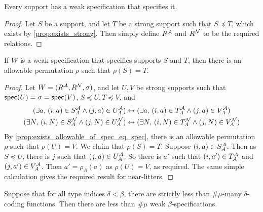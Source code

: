 \begin{proposition}
  \label{prop:exists_weakSpec}
  Every support has a weak specification that specifies it.
\end{proposition}
\begin{proof}
  Let \( S \) be a support, and let \( T \) be a strong support such that \( S \preceq T \), which exists by \cref{prop:exists_strong}.
  Then simply define \( R^{\mathcal A} \) and \( R^{\mathcal N} \) to be the required relations.
\end{proof}
\begin{proposition}
  \label{prop:exists_allowable_of_weakSpec}
  If \( W \) is a weak specification that specifies supports \( S \) and \( T \), then there is an allowable permutation \( \rho \) such that \( \rho(S) = T \).
\end{proposition}
\begin{proof}
  Let \( W = (R^{\mathcal A}, R^{\mathcal N}, \sigma) \), and let \( U, V \) be strong supports such that \( \operatorname{\mathsf{spec}}(U) = \sigma = \operatorname{\mathsf{spec}}(V) \), \( S \preceq U, T \preceq V \), and
  \begin{align*}
    (\exists a,\, (i, a) \in S_A^{\mathcal A} \wedge (j, a) \in U_A^{\mathcal A}) &\leftrightarrow (\exists a,\, (i, a) \in T_A^{\mathcal A} \wedge (j, a) \in V_A^{\mathcal A}) \\
    (\exists N,\, (i, N) \in S_A^{\mathcal N} \wedge (j, N) \in U_A^{\mathcal N}) &\leftrightarrow (\exists N,\, (i, N) \in T_A^{\mathcal N} \wedge (j, N) \in V_A^{\mathcal N})
  \end{align*}
  By \cref{prop:exists_allowable_of_spec_eq_spec}, there is an allowable permutation \( \rho \) such that \( \rho(U) = V \).
  We claim that \( \rho(S) = T \).
  Suppose \( (i, a) \in S_A^{\mathcal A} \).
  Then as \( S \preceq U \), there is \( j \) such that \( (j, a) \in U_A^{\mathcal A} \).
  So there is \( a' \) such that \( (i, a') \in T_A^{\mathcal A} \) and \( (j, a') \in V_A^{\mathcal A} \).
  Then \( a' = \rho_A(a) \) as \( \rho(U) = V \), as required.
  The same simple calculation gives the required result for near-litters.
\end{proof}
\begin{proposition}
  \label{prop:card_weakSpec}
  Suppose that for all type indices \( \delta < \beta \), there are strictly less than \( \#\mu \)-many \( \delta \)-coding functions.
  Then there are less than \( \#\mu \) weak \( \beta \)-specifications.
\end{proposition}
